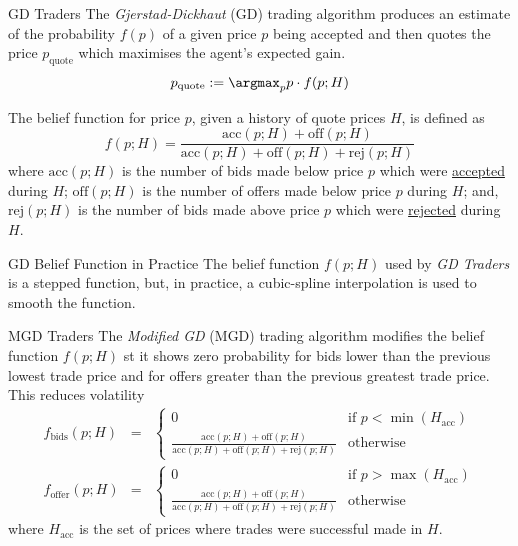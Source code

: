 \documentclass[11pt,a4paper]{article}
\begin{document}
  \begin{definition}{GD Traders}
    The \textit{Gjerstad-Dickhaut} (GD) trading algorithm produces an estimate of the probability $f(p)$ of a given price $p$ being accepted and then quotes the price $p_\text{quote}$ which maximises the agent's expected gain.
    \[ p_\text{quote}:=\argmax_{p}p\cdot f(p;H) \]
    \par The belief function for price $p$, given a history of quote prices $H$, is defined as
    \[ f(p;H)=\frac{\text{acc}(p;H)+\text{off}(p;H)}{\text{acc}(p;H)+\text{off}(p;H)+\text{rej}(p;H)} \]
    where $\text{acc}(p;H)$ is the number of bids made below price $p$ which were \underline{accepted} during $H$; $\text{off}(p;H)$ is the number of offers made below price $p$ during $H$; and, $\text{rej}(p;H)$ is the number of bids made above price $p$ which were \underline{rejected} during $H$.
  \end{definition}

  \begin{remark}{GD Belief Function in Practice}
    The belief function $f(p;H)$ used by \textit{GD Traders} is a stepped function, but, in practice, a cubic-spline interpolation is used to smooth the function.
  \end{remark}

  \begin{definition}{MGD Traders}
    The \textit{Modified GD} (MGD) trading algorithm modifies the belief function $f(p;H)$ st it shows zero probability for bids lower than the previous lowest trade price and for offers greater than the previous greatest trade price. This reduces volatility
    \[\begin{array}{rcl}
      f_\text{bids}(p;H)&=&\begin{cases}
      0&\text{if }p<\min(H_\text{acc})\\
      \frac{\text{acc}(p;H)+\text{off}(p;H)}{\text{acc}(p;H)+\text{off}(p;H)+\text{rej}(p;H)}&\text{otherwise}
      \end{cases}\\
      f_\text{offer}(p;H)&=&\begin{cases}
      0&\text{if }p>\max(H_\text{acc})\\
      \frac{\text{acc}(p;H)+\text{off}(p;H)}{\text{acc}(p;H)+\text{off}(p;H)+\text{rej}(p;H)}&\text{otherwise}
      \end{cases}
    \end{array}\]
    where $H_\text{acc}$ is the set of prices where trades were successful made in $H$.
  \end{definition}
\end{document}
